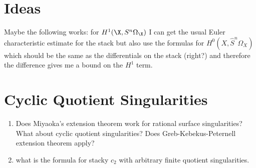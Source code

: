 \documentclass[12pt]{article}
\begin{document}
\section{Ideas}

Maybe the following works: for $H^1(\X, S^n \Omega_{\X})$ I can get the usual Euler characteristic estimate for the stack but also use the formulas for $H^0(X, \hat{S}^n \Omega_X)$ which should be the same as the differentials on the stack (right?) and therefore the difference gives me a bound on the $H^1$ term. 

\section{Cyclic Quotient Singularities}

\begin{enumerate}
\item Does Miyaoka's extension theorem work for rational surface singularities? What about cyclic quotient singularities? Does Greb-Kebekus-Peternell extension theorem apply?

\item what is the formula for stacky $c_2$ with arbitrary finite quotient singularities. 


\end{enumerate}
\end{document}
